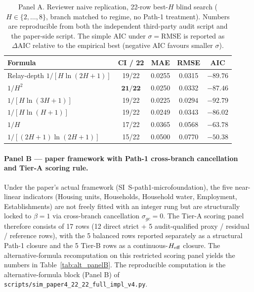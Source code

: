\begin{table}[!h]
\caption{Panel A. Reviewer naive replication, 22-row best-$H$ blind search ($H\!\in\!\{2,\dots,8\}$, branch matched to regime, no Path-1 treatment). Numbers are reproducible from both the independent third-party audit script and the paper-side script. The simple AIC under $\sigma\!=\!\mathrm{RMSE}$ is reported as $\Delta\mathrm{AIC}$ relative to the empirical best (negative AIC favours smaller $\sigma$).}
\label{tab:alt_panelA}
\centering
\begin{tabular}{lcccc}
\toprule
Formula & CI / 22 & MAE & RMSE & AIC \\
\midrule
Relay-depth $1/[H\ln(2H+1)]$               & 19/22 & 0.0255 & 0.0315 & $-89.76$ \\
$1/H^{2}$                           & $\mathbf{21/22}$ & 0.0250 & 0.0332 & $-87.46$ \\
$1/[H\ln(3H+1)]$                    & 19/22 & $\mathbf{0.0225}$ & $\mathbf{0.0294}$ & $\mathbf{-92.79}$ \\
$1/[H\ln(H+1)]$                     & 19/22 & 0.0249 & 0.0343 & $-86.02$ \\
$1/H$                               & 17/22 & 0.0365 & 0.0568 & $-63.78$ \\
$1/[(2H+1)\ln(2H+1)]$               & 15/22 & 0.0500 & 0.0770 & $-50.38$ \\
\bottomrule
\end{tabular}
\end{table}

\paragraph{Panel B --- paper framework with Path-1 cross-branch cancellation and Tier-A scoring rule.}
Under the paper's actual framework (SI~\textsf{S-path1-microfoundation}), the five near-linear indicators (Housing units, Households, Household water, Employment, Establishments) are not freely fitted with an integer rung but are structurally locked to $\beta\!=\!1$ via cross-branch cancellation $\sigma_{gc}\!=\!0$. The Tier-A scoring panel therefore consists of 17 rows (12 direct strict + 5 audit-qualified proxy / residual / reference rows), with the 5 balanced rows reported separately as a structural Path-1 closure and the 5 Tier-B rows as a continuous-$H_{\rm eff}$ closure. The alternative-formula recomputation on this restricted scoring panel yields the numbers in Table~\ref{tab:alt_panelB}. The reproducible computation is the alternative-formula block (Panel B) of \texttt{scripts/sim\_paper4\_22\_22\_full\_impl\_v4.py}.

